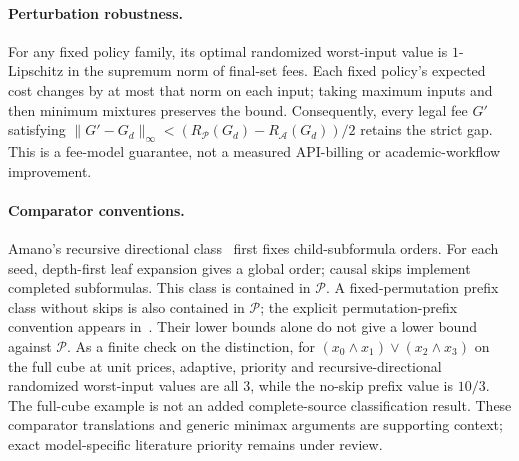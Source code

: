 \documentclass[pdflatex,sn-mathphys-num]{sn-jnl}
\theoremstyle{thmstyleone}
\theoremstyle{thmstylethree}
\theoremstyle{thmstyletwo}
\begin{document}
\paragraph*{Perturbation robustness.}
For any fixed policy family, its optimal randomized worst-input value
is $1$-Lipschitz in the supremum norm of final-set fees. Each fixed
policy's expected cost changes by at most that norm on each input;
taking maximum inputs and then minimum mixtures preserves the bound.
Consequently, every legal fee $G'$ satisfying
$\|G'-G_d\|_\infty<
(R_{\mathcal P}(G_d)-R_{\mathcal A}(G_d))/2$
retains the strict gap. This is a fee-model guarantee, not a measured
API-billing or academic-workflow improvement.

\paragraph*{Comparator conventions.}
Amano's recursive directional class~\cite{amano2011directional} first fixes child-subformula
orders. For each seed, depth-first leaf expansion gives a global order;
causal skips implement completed subformulas. This class is contained
in $\mathcal P$. A fixed-permutation prefix class without skips is
also contained in $\mathcal P$; the explicit permutation-prefix
convention appears in~\cite{hellerstein2022adaptivity}. Their lower bounds alone do not give a
lower bound against $\mathcal P$.
As a finite check on the distinction, for
$(x_0\wedge x_1)\vee(x_2\wedge x_3)$ on the full cube at unit prices,
adaptive, priority and recursive-directional randomized worst-input
values are all $3$, while the no-skip prefix value is $10/3$.
The full-cube example is not an added complete-source classification
result. These comparator translations and generic minimax arguments
are supporting context; exact model-specific literature priority
remains under review.

\end{document}
